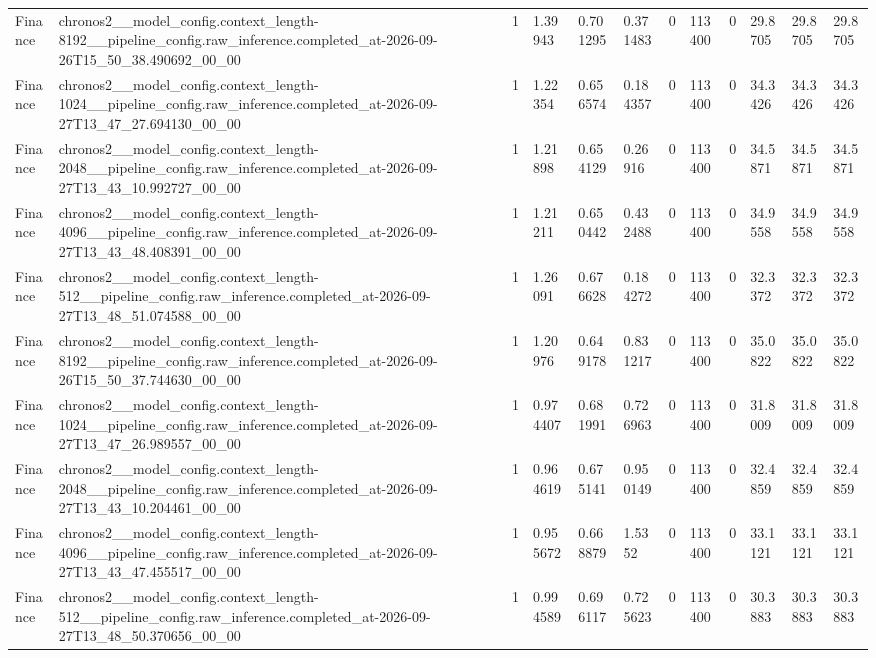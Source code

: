 \begin{tabular}{llllllllllll}
Finance & chronos2\_\_model\_config.context\_length-8192\_\_pipeline\_config.raw\_inference.completed\_at-2026-09-26T15\_50\_38.490692\_00\_00 & 1 & 1.39943 & 0.701295 & 0.371483 & 0 & 113400 & 0 & 29.8705 & 29.8705 & 29.8705 \\
Finance & chronos2\_\_model\_config.context\_length-1024\_\_pipeline\_config.raw\_inference.completed\_at-2026-09-27T13\_47\_27.694130\_00\_00 & 1 & 1.22354 & 0.656574 & 0.184357 & 0 & 113400 & 0 & 34.3426 & 34.3426 & 34.3426 \\
Finance & chronos2\_\_model\_config.context\_length-2048\_\_pipeline\_config.raw\_inference.completed\_at-2026-09-27T13\_43\_10.992727\_00\_00 & 1 & 1.21898 & 0.654129 & 0.26916 & 0 & 113400 & 0 & 34.5871 & 34.5871 & 34.5871 \\
Finance & chronos2\_\_model\_config.context\_length-4096\_\_pipeline\_config.raw\_inference.completed\_at-2026-09-27T13\_43\_48.408391\_00\_00 & 1 & 1.21211 & 0.650442 & 0.432488 & 0 & 113400 & 0 & 34.9558 & 34.9558 & 34.9558 \\
Finance & chronos2\_\_model\_config.context\_length-512\_\_pipeline\_config.raw\_inference.completed\_at-2026-09-27T13\_48\_51.074588\_00\_00 & 1 & 1.26091 & 0.676628 & 0.184272 & 0 & 113400 & 0 & 32.3372 & 32.3372 & 32.3372 \\
Finance & chronos2\_\_model\_config.context\_length-8192\_\_pipeline\_config.raw\_inference.completed\_at-2026-09-26T15\_50\_37.744630\_00\_00 & 1 & 1.20976 & 0.649178 & 0.831217 & 0 & 113400 & 0 & 35.0822 & 35.0822 & 35.0822 \\
Finance & chronos2\_\_model\_config.context\_length-1024\_\_pipeline\_config.raw\_inference.completed\_at-2026-09-27T13\_47\_26.989557\_00\_00 & 1 & 0.974407 & 0.681991 & 0.726963 & 0 & 113400 & 0 & 31.8009 & 31.8009 & 31.8009 \\
Finance & chronos2\_\_model\_config.context\_length-2048\_\_pipeline\_config.raw\_inference.completed\_at-2026-09-27T13\_43\_10.204461\_00\_00 & 1 & 0.964619 & 0.675141 & 0.950149 & 0 & 113400 & 0 & 32.4859 & 32.4859 & 32.4859 \\
Finance & chronos2\_\_model\_config.context\_length-4096\_\_pipeline\_config.raw\_inference.completed\_at-2026-09-27T13\_43\_47.455517\_00\_00 & 1 & 0.955672 & 0.668879 & 1.5352 & 0 & 113400 & 0 & 33.1121 & 33.1121 & 33.1121 \\
Finance & chronos2\_\_model\_config.context\_length-512\_\_pipeline\_config.raw\_inference.completed\_at-2026-09-27T13\_48\_50.370656\_00\_00 & 1 & 0.994589 & 0.696117 & 0.725623 & 0 & 113400 & 0 & 30.3883 & 30.3883 & 30.3883 \\

\end{tabular}
